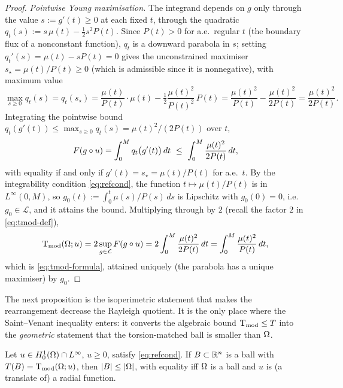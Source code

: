 \begin{proof}
\emph{Pointwise Young maximisation.} The integrand depends on $g$ only
through the value $s:=g'(t)\ge0$ at each fixed $t$, through the quadratic
$q_t(s):=s\,\mu(t)-\tfrac12 s^2P(t)$. Since $P(t)>0$ for a.e.\ regular $t$
(the boundary flux of a nonconstant function), $q_t$ is a downward parabola
in $s$; setting $q_t'(s)=\mu(t)-sP(t)=0$ gives the unconstrained maximiser
$s_\star=\mu(t)/P(t)\ge0$ (which is admissible since it is nonnegative), with
maximum value
\[
  \max_{s\ge0}q_t(s)=q_t(s_\star)
  =\frac{\mu(t)}{P(t)}\cdot\mu(t)-\tfrac12\frac{\mu(t)^2}{P(t)^2}\,P(t)
  =\frac{\mu(t)^2}{P(t)}-\frac{\mu(t)^2}{2P(t)}
  =\frac{\mu(t)^2}{2P(t)}.
\]
Integrating the pointwise bound $q_t(g'(t))\le\max_{s\ge0}q_t(s)
=\mu(t)^2/(2P(t))$ over $t$,
\[
  F(g\circ u)=\int_0^M q_t\bigl(g'(t)\bigr)\,dt
  \ \le\ \int_0^M\frac{\mu(t)^2}{2P(t)}\,dt,
\]
with equality if and only if $g'(t)=s_\star=\mu(t)/P(t)$ for a.e.\ $t$. By
the integrability condition \eqref{eq:refcond}, the function
$t\mapsto\mu(t)/P(t)$ is in $L^\infty(0,M)$, so $g_0(t):=\int_0^t
\mu(s)/P(s)\,ds$ is Lipschitz with $g_0(0)=0$, i.e.\ $g_0\in\mathcal L$, and
it attains the bound. Multiplying through by $2$ (recall the factor $2$ in
\eqref{eq:tmod-def}),
\[
  \operatorname{T_{\mathrm{mod}}}(\Omega;u)=2\sup_{g\in\mathcal L}F(g\circ u)
  =2\int_0^M\frac{\mu(t)^2}{2P(t)}\,dt
  =\int_0^M\frac{\mu(t)^2}{P(t)}\,dt,
\]
which is \eqref{eq:tmod-formula}, attained uniquely (the parabola has a
unique maximiser) by $g_0$.
\end{proof}

The next proposition is the isoperimetric statement that makes the
rearrangement decrease the Rayleigh quotient. It is the only place where
the Saint--Venant inequality enters: it converts the algebraic bound
$\operatorname{T_{\mathrm{mod}}}\le T$ into the \emph{geometric} statement that the torsion-matched
ball is smaller than $\Omega$.

\begin{proposition}\label{prop:isop-tmod}
Let $u\in H^1_0(\Omega)\cap L^\infty$, $u\ge0$, satisfy \eqref{eq:refcond}.
If $B\subset\mathbb R^n$ is a ball with $T(B)=\operatorname{T_{\mathrm{mod}}}(\Omega;u)$, then $\left|B\right|\le\left|\Omega\right|$,
with equality iff $\Omega$ is a ball and $u$ is (a translate of) a radial
function.
\end{proposition}

